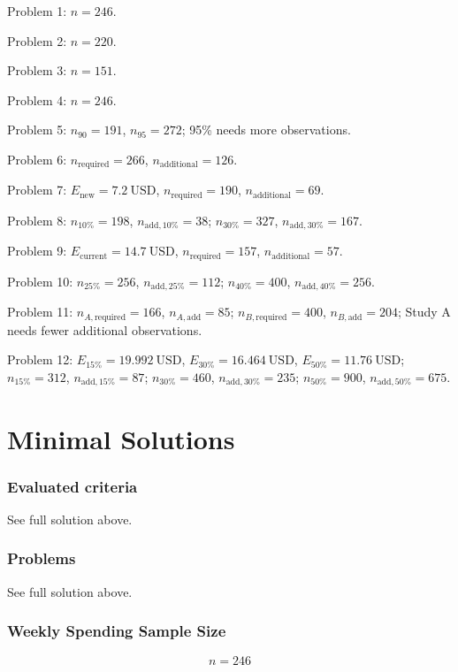 	\begin{ExamProblems}
		\item Problem 1: $n=246$.
		\item Problem 2: $n=220$.
		\item Problem 3: $n=151$.
		\item Problem 4: $n=246$.
		\item Problem 5: $n_{90}=191$, $n_{95}=272$; 95\% needs more observations.
		\item Problem 6: $n_{\text{required}}=266$, $n_{\text{additional}}=126$.
		\item Problem 7: $E_{\text{new}}=7.2\ \text{USD}$, $n_{\text{required}}=190$, $n_{\text{additional}}=69$.
		\item Problem 8: $n_{10\%}=198$, $n_{\text{add},10\%}=38$; $n_{30\%}=327$, $n_{\text{add},30\%}=167$.
		\item Problem 9: $E_{\text{current}}=14.7\ \text{USD}$, $n_{\text{required}}=157$, $n_{\text{additional}}=57$.
		\item Problem 10: $n_{25\%}=256$, $n_{\text{add},25\%}=112$; $n_{40\%}=400$, $n_{\text{add},40\%}=256$.
		\item Problem 11: $n_{A,\text{required}}=166$, $n_{A,\text{add}}=85$; $n_{B,\text{required}}=400$, $n_{B,\text{add}}=204$; Study A needs fewer additional observations.
		\item Problem 12: $E_{15\%}=19.992\ \text{USD}$, $E_{30\%}=16.464\ \text{USD}$, $E_{50\%}=11.76\ \text{USD}$; $n_{15\%}=312$, $n_{\text{add},15\%}=87$; $n_{30\%}=460$, $n_{\text{add},30\%}=235$; $n_{50\%}=900$, $n_{\text{add},50\%}=675$.
	\end{ExamProblems}
	


\part{Minimal Solutions}

\section*{Evaluated criteria}
See full solution above.

\section*{Problems}
See full solution above.

\section*{Weekly Spending Sample Size}
\[n = 246\]

